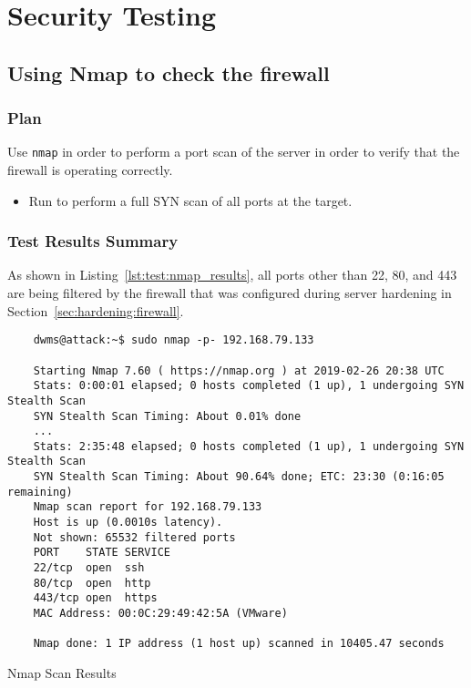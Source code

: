 \section{Security Testing}
\subsection{Using Nmap to check the firewall}
\subsubsection*{Plan}
Use \texttt{nmap} in order to perform a port scan of the server in order to verify that the firewall is operating correctly.
\begin{itemize}
  \item Run  to perform a full SYN scan of all ports at the target.
\end{itemize}

\subsubsection*{Test Results Summary}
As shown in Listing~\ref{lst:test:nmap_results}, all ports other than 22, 80, and 443 are being filtered by the firewall that was configured during server hardening in Section~\ref{sec:hardening:firewall}.
\begin{listing}[H]
  \captionsetup{skip=\skiplistingcaptionlen}
  \begin{verbatim}
    dwms@attack:~$ sudo nmap -p- 192.168.79.133

    Starting Nmap 7.60 ( https://nmap.org ) at 2019-02-26 20:38 UTC
    Stats: 0:00:01 elapsed; 0 hosts completed (1 up), 1 undergoing SYN Stealth Scan
    SYN Stealth Scan Timing: About 0.01% done
    ...
    Stats: 2:35:48 elapsed; 0 hosts completed (1 up), 1 undergoing SYN Stealth Scan
    SYN Stealth Scan Timing: About 90.64% done; ETC: 23:30 (0:16:05 remaining)
    Nmap scan report for 192.168.79.133
    Host is up (0.0010s latency).
    Not shown: 65532 filtered ports
    PORT    STATE SERVICE
    22/tcp  open  ssh
    80/tcp  open  http
    443/tcp open  https
    MAC Address: 00:0C:29:49:42:5A (VMware)

    Nmap done: 1 IP address (1 host up) scanned in 10405.47 seconds
  \end{verbatim}
  \caption{Nmap Scan Results}
  \label{lst:test:nmap_results}
\end{listing}

